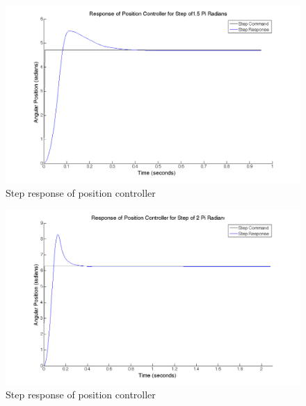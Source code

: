 \documentclass{article}
\theoremstyle{plain}
\theoremstyle{definition}
\theoremstyle{remark}
\begin{document}
\begin{figure}[htb]
\begin{center}
\includegraphics[width = 14cm]{posstep_15pi.png}
\caption{Step response of position controller}
\label{q5_b2}
\end{center}
\end{figure}

\begin{figure}[htb]
\begin{center}
\includegraphics[width = 14cm]{posstep_2pi.png}
\caption{Step response of position controller}
\label{q5_b3}
\end{center}
\end{figure}
\end{document}
